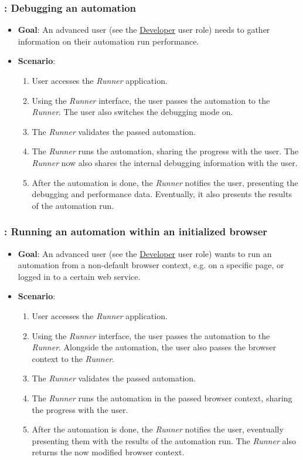 \subsubsection*{\usecase: Debugging an automation}
\begin{itemize}
    \item \textbf{Goal}: An advanced user (see the \hyperref[DevUserRole]{Developer} user role) needs to gather information on their automation run performance.
    \item \textbf{Scenario}: 
    \begin{enumerate}[label=\arabic*.]
        \item User accesses the \textit{Runner} application. 
        \item Using the \textit{Runner} interface, the user passes the automation to the \textit{Runner}. The user also
        switches the debugging mode on.
        \item The \textit{Runner} validates the passed automation.
        \item The \textit{Runner} runs the automation, sharing the progress with the user.
        The \textit{Runner} now also shares the internal debugging information with the user. 
        \item After the automation is done, the \textit{Runner} notifies the user, presenting the debugging 
        and performance data. Eventually, it also presents the results of the automation run.
    \end{enumerate}
\end{itemize}

\subsubsection*{\usecase: Running an automation within an initialized browser}
\begin{itemize}
    \item \textbf{Goal}: An advanced user (see the \hyperref[DevUserRole]{Developer} user role) wants to run an automation from a non-default browser context, e.g. on a specific page, or logged in to a certain web service.
    \item \textbf{Scenario}: 
    \begin{enumerate}[label=\arabic*.]
        \item User accesses the \textit{Runner} application. 
        \item Using the \textit{Runner} interface, the user passes the automation to the \textit{Runner}. 
        Alongside the automation, the user also passes the browser context to the \textit{Runner}.
        \item The \textit{Runner} validates the passed automation.
        \item The \textit{Runner} runs the automation in the passed browser context, sharing the progress with the user.
        \item After the automation is done, the \textit{Runner} notifies the user, eventually presenting them with the results of the automation run.
        The \textit{Runner} also returns the now modified browser context.
    \end{enumerate}
\end{itemize}

